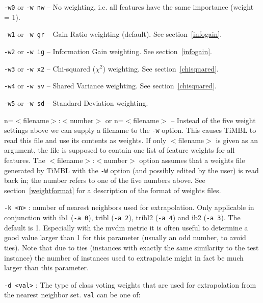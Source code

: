 \documentclass{book}
\begin{document}
\begin{description}
	\begin{description}
	\item {\tt -w0} or {\tt -w nw} -- No weighting, i.e. all features have the same
	importance (weight = 1).
	\item {\tt -w1} or {\tt -w gr} -- Gain Ratio weighting (default). See section~\ref{infogain}.
	\item {\tt -w2} or {\tt -w ig} -- Information Gain weighting. See section~\ref{infogain}.
	\item {\tt -w3} or {\tt -w x2} -- Chi-squared ($\chi^2$)
          weighting. See section~\ref{chisquared}.
	\item {\tt -w4} or {\tt -w sv} -- Shared Variance weighting. See
          section~\ref{chisquared}.
        \item {\tt -w5} or {\tt -w sd} -- Standard Deviation weighting.
	\item n=$<$filename$>$:$<$number$>$ or n=$<$filename$>$ --
          Instead of the five weight settings above we can supply a
          filename to the {\tt -w} option. This causes TiMBL to read
          this file and use its contents as weights. If only
          $<$filename$>$ is given as an argument, the file is supposed
          to contain one list of feature weights for all features. The
          $<$filename$>$:$<$number$>$ option assumes that a weights
          file generated by TiMBL with the {\tt -W} option (and
          possibly edited by the user) is read back in; the number
          refers to one of the five numbers above. See
          section~\ref{weightformat} for a description of the format
          of weights files.
	\end{description}

\item {\tt -k <n>} : number of nearest neighbors used for
        extrapolation. Only applicable in conjunction with {\sc ib1}
        ({\tt -a 0}), {\sc tribl} ({\tt -a 2}), {\sc tribl2} ({\tt -a
          4}) and {\sc ib2} ({\tt -a 3}). The default is 1. Especially
        with the {\sc mvdm} metric it is often useful to determine a
        good value larger than 1 for this parameter (usually an odd
        number, to avoid ties). Note that due to ties (instances with
        exactly the same similarity to the test instance) the number
        of instances used to extrapolate might in fact be much larger
        than this parameter.

\item {\tt -d <val>} : The type of class voting weights that are used for
extrapolation from the nearest neighbor set. {\tt val} can be one of:
	\begin{itemize}


\end{itemize}
\end{description}
\end{document}
